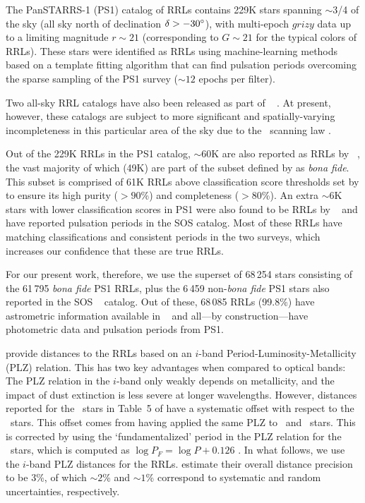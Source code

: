 \documentclass[twocolumn]{aastex63}
\begin{document}
The PanSTARRS-1 (PS1) catalog of RRLs \citep{Sesar:2017b} contains 229K stars spanning $\sim$3/4 of the sky (all sky north of declination $\delta > -30\mbox{$^\circ$}$), with multi-epoch $grizy$ data up to a limiting magnitude $r\sim21$ (corresponding to $G \sim 21$ for the typical colors of RRLs). These stars were identified as RRLs using machine-learning methods based on a template fitting algorithm that can find pulsation periods overcoming the sparse sampling of the PS1 survey ($\sim12$ epochs per filter).

Two all-sky RRL catalogs have also been released as part of \Gaia~ \citep[VariClassifier and Specific Object Studies][]{Holl2018, Rimoldini2018, Clementini2018}. At present, however, these catalogs are subject to more significant and spatially-varying incompleteness in this particular area of the sky due to the \Gaia\ scanning law \citep[see][though many of these issues will improve with future \Gaia\ data releases]{Rimoldini2018}.

Out of the 229K RRLs in the PS1 catalog, $\sim60$K are also reported as RRLs by \Gaia~, the vast majority of which (49K) are part of the subset defined by \citet{Sesar:2017b} as \emph{bona fide}. This subset is comprised of 61K RRLs above classification score thresholds set by \citet{Sesar:2017b} to ensure its high purity ($>90$\%) and completeness ($>80$\%). An extra $\sim6$K stars with lower classification scores in PS1 were also found to be RRLs by \Gaia~ and have reported pulsation periods in the SOS catalog. Most of these RRLs have matching classifications and consistent periods in the two surveys, which increases our confidence that these are true RRLs.

For our present work, therefore, we use the superset of 68\,254 stars consisting of the 61\,795 \emph{bona fide} PS1 RRLs, plus the 6\,459 non-\emph{bona fide} PS1 stars also reported in the SOS \Gaia~ catalog. Out of these, 68\,085 RRLs (99.8\%) have astrometric information available in \Gaia~ and all---by construction---have photometric data and pulsation periods from PS1.

\citet{Sesar:2017b} provide distances to the RRLs based on an $i$-band Period-Luminosity-Metallicity (PLZ) relation.
This has two key advantages when compared to optical bands: The PLZ relation in the $i$-band only weakly depends on metallicity, and the impact of dust extinction is less severe at longer wavelengths.
However, distances reported for the \rrc~stars in Table~5 of \citet{Sesar:2017b} have a systematic offset with respect to the \typeab~stars.
This offset comes from having applied the same PLZ to \typeab~and \typec~stars.
This is corrected by using the `fundamentalized' period in the PLZ relation for the \rrc~stars, which is computed as $\log{P_F} = \log P + 0.126$ \citep[following][]{Braga2016}.
In what follows, we use the $i$-band PLZ distances for the RRLs.
\citet{Sesar:2017b} estimate their overall distance precision to be 3\%, of which $\sim2$\% and $\sim1$\% correspond to systematic and random uncertainties, respectively.
\end{document}
